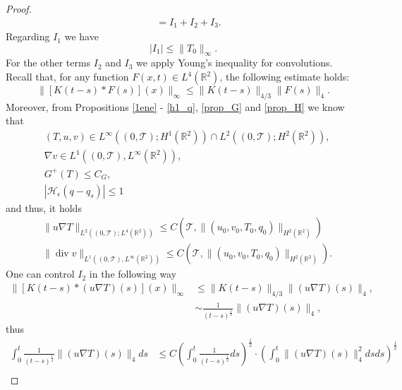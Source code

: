 \documentclass[11pt, a4paper, article,reqno,]{amsart}
\theoremstyle{remark}
\DeclareMathOperator{\dive}{div}
\numberwithin{equation}{section}
\begin{document}
\begin{proof}
\begin{equation*}
\begin{aligned}
        & \; = I_1 + I_2+ I_3.
    \end{aligned}
\end{equation*}
Regarding  $I_1$ we have
\begin{equation*}
    |I_1| \leq \|T_0\|_{\infty}.
\end{equation*}
For the other terms $I_2$ and $I_3$ we apply Young’s inequality for convolutions. Recall that, for any function \( F(x,t) \in L^4(\mathbb{R}^2) \), the following estimate holds:
\begin{equation*}
    \|[K(t-s) * F(s)](x)\|_\infty \leq \|K(t-s)\|_{4/3} \|F(s)\|_4.
\end{equation*}
Moreover, from Propositions \ref{1ene} - \ref{h1_q},  \eqref{prop_G} and \eqref{prop_H} we know that
\begin{equation*}
    \begin{aligned}
        & (T,u,v) \in L^{\infty}((0,\mathcal{T});H^1(\mathbb{R}^2))\cap L^2((0,\mathcal{T});H^2(\mathbb{R}^2)), \\
        & \nabla v \in L^1((0,\mathcal{T}),L^\infty(\mathbb{R}^2)),\\
        & G^+(T) \leq C_G,\\
        &|\mathcal{H}_\epsilon(q-q_s)| \leq 1
    \end{aligned}
\end{equation*}
and thus, it holds 
\begin{equation*}
    \begin{aligned}
        & \|u \nabla T\|_{L^2((0,\mathcal{T});L^4(\mathbb{R}^2))} \leq C(\mathcal{T}, \|(u_0,v_0,T_0,q_0)\|_{H^2(\mathbb{R}^2)}) \\
        & \|\dive v\|_{L^1((0,\mathcal{T}),L^\infty(\mathbb{R}^2))}\leq C(\mathcal{T}, \|(u_0,v_0,T_0,q_0)\|_{H^2(\mathbb{R}^2)}).
    \end{aligned}
\end{equation*}
One can control $I_2$ in the following way
\begin{equation*}
    \begin{aligned}
         \|[K(t-s) * (u \nabla T)(s)](x)\|_\infty & \leq  \|K(t-s)\|_{4/3} \|(u \nabla T)(s)\|_4, \\
         & \sim \frac{1}{(t-s)^{\frac{1}{4}}} \|(u \nabla T)(s)\|_4,
    \end{aligned}
\end{equation*}
thus
\begin{equation*}
\begin{aligned}
     \int_0^t \frac{1}{(t-s)^{\frac{1}{4}}} \|(u \nabla T)(s)\|_4 ds & \leq C  \left( \int_0^t \frac{1}{(t-s)^{\frac{1}{2}}}ds \right)^{\frac{1}{2}} \cdot \left( \int_0^t \|(u \nabla T)(s)\|_4^2 ds ds \right)^{\frac{1}{2}} \\

\end{aligned}
\end{equation*}
\end{proof}
\end{document}
